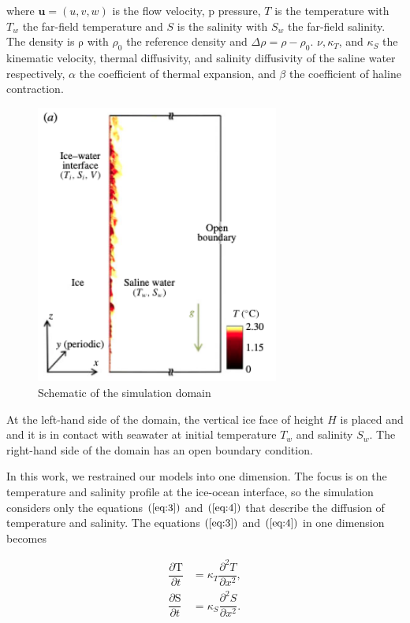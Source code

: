 \documentclass[11pt,a4paper]{article}
\begin{document}
	where $\mathbf{u} = (u,v,w)$ is the flow velocity, $\mathrm{p}$ pressure, $T$ is the temperature with $T_w$ the far-field temperature and $S$ is the salinity with $S_w$ the far-field salinity. The density is $\mathrm{\rho}$ with $\rho_0$ the reference density and $\Delta \rho = \rho-\rho_0$. $\nu, \kappa_T$, and $\kappa_S$  the kinematic velocity, thermal diffusivity, and salinity diffusivity of the saline water respectively, $\alpha$  the coefficient of thermal expansion, and $\beta$ the coefficient of haline contraction.
	
	\begin{figure}[H]
	    \centering 
	    \includegraphics[width=8cm]{domain}
	    \caption{Schematic of the simulation domain \cite{gayen2016simulation}}
	\end{figure}
	
	At the left-hand side of the domain, the vertical ice face of height $H$ is placed and and it is in contact with seawater at initial temperature $T_w$ and salinity $S_w$. The right-hand side of the domain has an open boundary condition.
	
	In this work, we restrained our models into one dimension. The focus is on the temperature and salinity profile at the ice-ocean interface, so the simulation considers only the equations $(\ref{eq:3})$ and $(\ref{eq:4})$ that describe the diffusion of temperature and salinity. The equations $(\ref{eq:3})$ and $(\ref{eq:4})$ in one dimension becomes
	
	\begin{eqnarray}
		\label{eq:6}
		\dfrac{\partial\mathrm{T}}{\partial t} & = \kappa_T\dfrac{\partial^2T}{\partial x^2} ,\\[0.3cm] 
		\label{eq:7}
		\dfrac{\partial\mathrm{S}}{\partial t} & = \kappa_S\dfrac{\partial^2S}{\partial x^2} . 
	\end{eqnarray}
	
\end{document}
